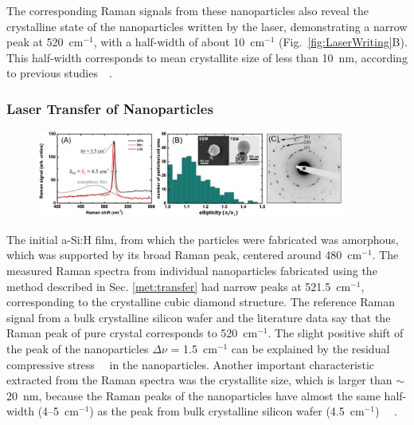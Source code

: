             The corresponding Raman signals from these nanoparticles also reveal the crystalline state of the nanoparticles written
            by the laser, demonstrating a narrow peak at 520~cm$^{-1}$, with a half-width of about 10~cm$^{-1}$ (Fig.~\ref{fig:LaserWriting}B).
            This half-width corresponds to mean crystallite size of less than 10~nm, according to previous studies~~\cite{campbell1986effects}.

        \subsubsection{Laser Transfer of Nanoparticles}
            \begin{figure}[!ht]
                    \begin{center}
                        \includegraphics[width=0.9\textwidth]{figs/results/fab/Crystallinity.eps}
                    \end{center}
                    \caption{}
                    \label{fig:Crystallinity}
            \end{figure}

                The initial a-Si:H film, from which the particles were fabricated was amorphous, which was supported by its broad Raman
            peak, centered around 480~cm$^{-1}$. The measured Raman spectra from individual nanoparticles fabricated using the method
            described in Sec. \ref{met:transfer} had narrow peaks at 521.5~cm$^{-1}$, corresponding to the crystalline cubic diamond structure.
            The reference Raman signal from a bulk crystalline silicon wafer and the literature data say that the Raman peak of pure crystal
            corresponds to 520~cm$^{-1}$.
            The slight positive shift of the peak of the nanoparticles $\Delta$$\nu$ = 1.5~cm$^{-1}$ can be explained by the
            residual compressive stress~~\cite{de1996micro} in the nanoparticles. Another important characteristic extracted from the Raman spectra
            was the crystallite size, which is larger than $\sim$20~nm, because the Raman peaks of the nanoparticles have
            almost the same half-width (4--5~cm$^{-1}$) as the peak from bulk crystalline silicon wafer (4.5~cm$^{-1}$)
            ~~\cite{campbell1986effects}.

